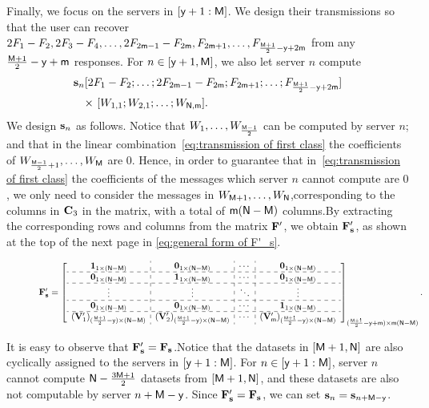 \documentclass[conference,letterpaper]{IEEEtran}
\begin{document}
Finally, we focus on the servers in $[{\sf y}+1 : {\sf M}]$. We design their transmissions so that the user can recover $2F_1 - F_2, 2F_3 - F_4, \ldots, 2F_{2{\sf m}-1} - F_{2{\sf m}}, F_{2{\sf m}+1}, \ldots, F_{\frac{{\sf M}+1}{2} - {\sf y} + 2{\sf m}}$ from any $\frac{{\sf M}+1}{2} - {\sf y} + {\sf m}$ responses.
 For $n \in [{\sf y}+1, {\sf M}]$, we also let server $n$ compute
\begin{align}
{\bf s}_n & [ 2F_1 - F_2; \ldots; 2F_{2{\sf m}-1} - F_{2{\sf m}}; F_{2{\sf m}+1}; \ldots; F_{\frac{{\sf M}+1}{2} - {\sf y} + 2{\sf m}} ]  \nonumber \\
& \text{× }[ W_{1,1}; W_{2,1}; \ldots; W_{{\sf N},{\sf m}} ].
\label{eq:transmission of first class}
\end{align}
     We design ${\bf s}_{n} $ as follows.
Notice that $W_1,\ldots,W_{\frac{{\sf M}-1}{2}}$ can be computed by server $n$; and that in the linear combination~\eqref{eq:transmission of first class} the coefficients of   $W_{\frac{{\sf M}-1}{2}+1}, \ldots, W_{{\sf M}}$ are $0$. 
Hence, in order to guarantee that in~\eqref{eq:transmission of first class} the coefficients of the messages which server $n$ cannot compute are $0$, we only need to consider the messages in $W_{{\sf M}+1}, \ldots, W_{{\sf N}}$,corresponding to the columns in ${\bf C}_3$ in the matrix, with a total of ${\sf m} ({\sf N} - {\sf M})$ columns.By extracting the corresponding rows and columns from the matrix \( {\bf F}' \), we obtain \( {\bf F}'_{\bf s} \), as shown at the top of the next page in \eqref{eq:general form of F'_s}.
\begin{figure}
\begin{equation}
\scalebox{0.8}{$
 {\bf F}'_{\bf s} = 
\left[
\begin{array}{c:c:c:c}
{\bf 1}_{1 \times (\Nsf-\Msf)}  & {\bf 0}_{1 \times (\Nsf-\Msf)}  & \cdots & {\bf 0}_{1 \times (\Nsf-\Msf)}   \\ \hdashline
{\bf 0}_{1 \times (\Nsf-\Msf)} &  {\bf 1}_{1 \times (\Nsf-\Msf)}   & \cdots & {\bf 0}_{1 \times (\Nsf-\Msf)}   \\ \hdashline 
 \vdots   & \vdots  &  \ddots & \vdots \\ \hdashline
 {\bf 0}_{1 \times (\Nsf-\Msf)} &   {\bf 0}_{1 \times (\Nsf-\Msf)}    & \cdots &  {\bf 1}_{1 \times (\Nsf-\Msf)} \\ \hdashline
 ({\bf V}'_{1})_{ (\frac{\Msf + 1}{2} - \ysf) \times (\Nsf-\Msf)}  &  ({\bf V}'_{2})_{ (\frac{\Msf + 1}{2} - \ysf) \times (\Nsf-\Msf)}  &   \cdots   &   ({\bf V}'_{\msf})_{ (\frac{\Msf + 1}{2} - \ysf) \times (\Nsf-\Msf)} 
 \end{array}
\right]_{(\frac{\Msf + 1}{2} - \ysf + \msf) \times \msf(\Nsf-\Msf)}.
$}
\label{eq:general form of F'_s}
\end{equation}

\end{figure}
It is easy to observe that ${\bf F}'_{\bf s} = {\bf F}_{\bf s}$.Notice that the datasets in $[{\sf M}+1, {\sf N}]$ are also cyclically assigned to the servers in $[{\sf y}+1 : {\sf M}]$. For $n \in [{\sf y}+1 : {\sf M}]$, server $n$ cannot compute ${{\sf N} - \frac{3{\sf M} + 1}{2}}$ datasets from $[{\sf M}+1, {\sf N}]$, and these datasets are also not computable by server $n + {\sf M} - {\sf y}$. Since ${\bf F}'_{\bf s} = {\bf F}_{\bf s}$, we can  set ${\bf s}_n = {\bf s}_{n + {\sf M} - {\sf y}}$.
\end{document}
